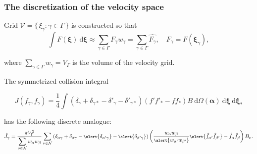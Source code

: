 \documentclass[mathserif]{beamer} %
\newcommand{\dd}{\:\mathrm{d}}
\newcommand{\dxi}{\boldsymbol{\dd\xi}}
\newcommand{\bxi}{\boldsymbol{\xi}}
\newcommand{\Nu}{\mathcal{N}}
\newcommand{\Set}[2]{\{\,{#1}:{#2}\,\}}
\begin{document}
\begin{frame}
    \frametitle{The discretization of the velocity space}
    Grid \(\mathcal{V} = \Set{\xi_\gamma}{\gamma\in\Gamma}\) is constructed so that
    \begin{equation}\label{eq:xi_cubature}
        \int F(\bxi) \dxi \approx \sum_{\gamma\in\Gamma} F_\gamma w_\gamma =
            \sum_{\gamma\in\Gamma} \hat{F_\gamma},
            \quad F_\gamma = F(\bxi_\gamma),
    \end{equation}\vspace{-10pt}

    where \(\sum_{\gamma\in\Gamma} w_\gamma = V_\Gamma\) is the volume of the velocity grid.
    \pause\vspace{20pt}

    The symmetrized collision integral\vspace{-20pt}

    \begin{equation}\label{eq:symm_ci}
        J(f_\gamma, f_\gamma) = \frac14\int \left(
            \delta_\gamma + \delta_{\gamma*} - \delta'_\gamma - \delta'_{\gamma*}
        \right) (f'f'_* - ff_*)B \dd\Omega(\boldsymbol{\alpha}) \dxi\dxi_*
    \end{equation}\vspace{-30pt}

    has the following discrete analogue:
    \begin{equation}\label{eq:discrete_symm_ci}
        \footnotesize
        \hat{J}_\gamma = \frac{\pi V_\Gamma^2}{\displaystyle\sum_{\nu\in\Nu} w_{\alpha}w_{\beta}}
            \sum_{\nu\in\Nu} \left(
                \delta_{\alpha\gamma} + \delta_{\beta\gamma} - \alert{\delta_{\alpha'\gamma}} - \alert{\delta_{\beta'\gamma}}
            \right)\left(
                \frac{w_{\alpha}w_{\beta}}{\alert{w_{\alpha'}w_{\beta'}}}
                \alert{\hat{f}_{\alpha'}\hat{f}_{\beta'}} - \hat{f}_{\alpha}\hat{f}_{\beta}
            \right)B_\nu.
    \end{equation}\vspace{-10pt}
\end{frame}
\end{document}
